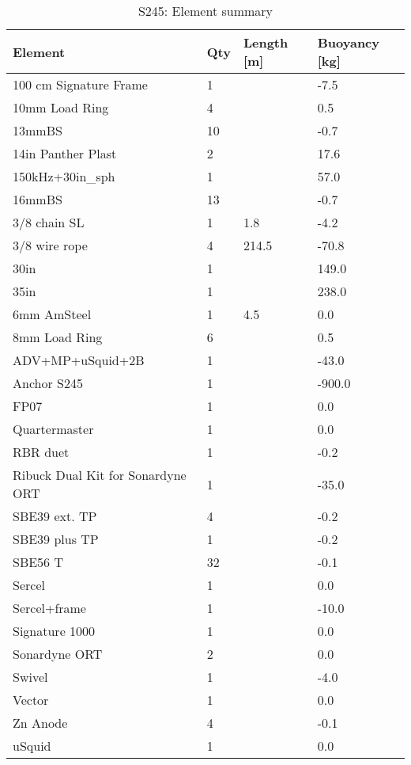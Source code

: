 \documentclass{article}
\begin{document}
\begin{table}[!htbp]
\centering
\caption{S245: Element summary}
\begin{tabular}{llll}
\toprule
Element & Qty & Length [m] & Buoyancy [kg] \\
\midrule
100 cm Signature Frame & 1 &  & -7.5 \\
10mm Load Ring & 4 &  & 0.5 \\
13mmBS & 10 &  & -0.7 \\
14in Panther Plast & 2 &  & 17.6 \\
150kHz+30in\_sph & 1 &  & 57.0 \\
16mmBS & 13 &  & -0.7 \\
3/8 chain SL & 1 & 1.8 & -4.2 \\
3/8 wire rope & 4 & 214.5 & -70.8 \\
30in & 1 &  & 149.0 \\
35in & 1 &  & 238.0 \\
6mm AmSteel & 1 & 4.5 & 0.0 \\
8mm Load Ring & 6 &  & 0.5 \\
ADV+MP+uSquid+2B & 1 &  & -43.0 \\
Anchor S245 & 1 &  & -900.0 \\
FP07 & 1 &  & 0.0 \\
Quartermaster & 1 &  & 0.0 \\
RBR duet & 1 &  & -0.2 \\
Ribuck Dual Kit for Sonardyne ORT & 1 &  & -35.0 \\
SBE39 ext. TP & 4 &  & -0.2 \\
SBE39 plus TP & 1 &  & -0.2 \\
SBE56 T & 32 &  & -0.1 \\
Sercel & 1 &  & 0.0 \\
Sercel+frame & 1 &  & -10.0 \\
Signature 1000 & 1 &  & 0.0 \\
Sonardyne ORT & 2 &  & 0.0 \\
Swivel & 1 &  & -4.0 \\
Vector & 1 &  & 0.0 \\
Zn Anode & 4 &  & -0.1 \\
uSquid & 1 &  & 0.0 \\
\bottomrule
\end{tabular}
\end{table}
\end{document}
